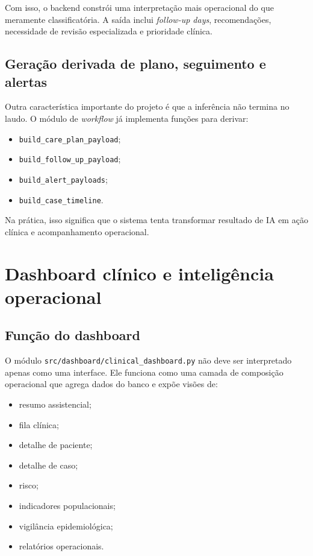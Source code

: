 \documentclass[
    12pt,
    openright,
    oneside,
    a4paper,
    chapter=TITLE,
    section=TITLE,
    brazil,
    sumario=tradicional,
    hidelinks
]{abntex2}
\begin{document}
Com isso, o backend constr\'oi uma interpreta\c{c}\~ao mais operacional do que meramente classificat\'oria. A sa\'ida inclui \textit{follow-up days}, recomenda\c{c}\~oes, necessidade de revis\~ao especializada e prioridade cl\'inica.

\section{Gera\c{c}\~ao derivada de plano, seguimento e alertas}

Outra caracter\'istica importante do projeto \'e que a infer\^encia n\~ao termina no laudo. O m\'odulo de \textit{workflow} j\'a implementa fun\c{c}\~oes para derivar:

\begin{itemize}
    \item \texttt{build\_care\_plan\_payload};
    \item \texttt{build\_follow\_up\_payload};
    \item \texttt{build\_alert\_payloads};
    \item \texttt{build\_case\_timeline}.
\end{itemize}

Na pr\'atica, isso significa que o sistema tenta transformar resultado de IA em a\c{c}\~ao cl\'inica e acompanhamento operacional.

\chapter{Dashboard cl\'inico e intelig\^encia operacional}

\section{Fun\c{c}\~ao do dashboard}

O m\'odulo \texttt{src/dashboard/clinical\_dashboard.py} n\~ao deve ser interpretado apenas como uma interface. Ele funciona como uma camada de composi\c{c}\~ao operacional que agrega dados do banco e exp\~oe vis\~oes de:

\begin{itemize}
    \item resumo assistencial;
    \item fila cl\'inica;
    \item detalhe de paciente;
    \item detalhe de caso;
    \item risco;
    \item indicadores populacionais;
    \item vigil\^ancia epidemiol\'ogica;
    \item relat\'orios operacionais.
\end{itemize}
\end{document}
